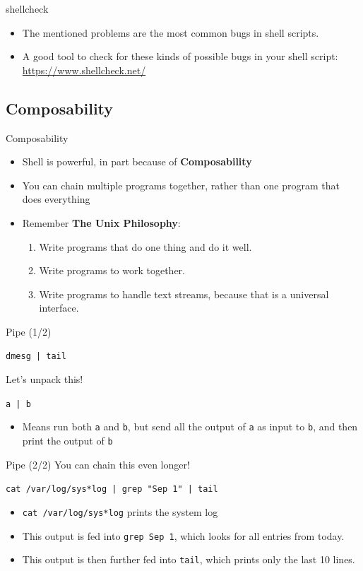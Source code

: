 \documentclass[12pt]{beamer}
\begin{document}
\begin{frame}{shellcheck}
  \begin{itemize}
    \item The mentioned problems are the most common bugs in shell scripts.
    \item A good tool to check for these kinds of possible bugs in your shell script: \url{https://www.shellcheck.net/}
  \end{itemize}
\end{frame}

\subsection{Composability}
\begin{frame}{Composability}
  \begin{itemize}
    \item Shell is powerful, in part because of \textbf{Composability}
    \item You can chain multiple programs together, rather than one program that does everything
    \item Remember \textbf{The Unix Philosophy}:
          \begin{enumerate}
            \item Write programs that do one thing and do it well.
            \item Write programs to work together.
            \item Write programs to handle text streams, because that is a universal interface.
          \end{enumerate}
  \end{itemize}
\end{frame}

\begin{frame}[fragile]{Pipe (1/2)}
  \begin{verbatim}
dmesg | tail
  \end{verbatim}
  Let's unpack this!

  \texttt{a | b}
  \begin{itemize}
    \item Means run both \texttt{a} and \texttt{b}, but send all the output of \texttt{a} as input to \texttt{b}, and then print the output of \texttt{b}
  \end{itemize}
\end{frame}

\begin{frame}[fragile]{Pipe (2/2)}
  You can chain this even longer!

  \texttt{cat /var/log/sys*log | grep "Sep 1" | tail}
  \begin{itemize}
    \item \texttt{cat /var/log/sys*log} prints the system log
    \item This output is fed into \texttt{grep Sep 1}, which looks for all entries from today.
    \item This output is then further fed into \texttt{tail}, which prints only the last 10 lines.
  \end{itemize}
\end{frame}
\end{document}
